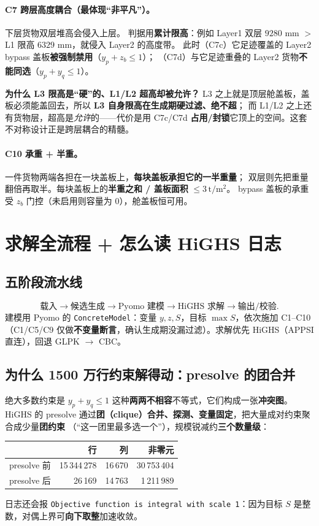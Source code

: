 \documentclass[11pt]{ctexart}
\newcommand{\unit}[1]{\,\mathrm{#1}}
\newcommand{\code}[1]{\texttt{#1}}
\begin{document}
\paragraph{C7 跨层高度耦合（最体现“非平凡”）。}下层货物双层堆高会侵入上层。
判据用\textbf{累计限高}：例如 Layer1 双层 $9280$ mm $>$ L1 限高 $6329$ mm，就侵入 Layer2 的高度带。
此时（C7c）它足迹覆盖的 Layer2 bypass 盖板\textbf{被强制禁用}（$y_p+z_b\le1$）；
（C7d）与它足迹重叠的 Layer2 货物\textbf{不能同选}（$y_p+y_q\le1$）。
\begin{key}\textbf{为什么 L3 限高是“硬”的、L1/L2 超高却被允许？}
L3 之上就是顶层舱盖板，盖板必须能盖回去，所以 \textbf{L3 自身限高在生成期硬过滤、绝不超}；
而 L1/L2 之上还有货物层，超高是\emph{允许}的——代价是用 C7c/C7d \textbf{占用/封锁}它顶上的空间。这套不对称设计正是跨层耦合的精髓。
\end{key}

\paragraph{C10 承重 + 半重。}一件货物两端各担在一块盖板上，\textbf{每块盖板承担它的一半重量}；
双层则先把重量翻倍再取半。每块盖板上的\textbf{半重之和 / 盖板面积} $\le 3\unit{t/m^2}$。
bypass 盖板的承重受 $z_b$ 门控（未启用则容量为 0），舱盖板恒可用。

\section{求解全流程 + 怎么读 HiGHS 日志}

\subsection{五阶段流水线}
\[
\text{载入}\to\text{候选生成}\to\text{Pyomo 建模}\to\text{HiGHS 求解}\to\text{输出/校验}.
\]
建模用 Pyomo 的 \code{ConcreteModel}：变量 $y,z,S$，目标 $\max S$，依次施加 C1--C10
（C1/C5/C9 仅做\textbf{不变量断言}，确认生成期没漏过滤）。求解优先 HiGHS（APPSI 直连），回退 GLPK $\to$ CBC。

\subsection{为什么 1500 万行约束解得动：presolve 的团合并}
绝大多数约束是 $y_p+y_q\le1$ 这种\textbf{两两不相容}不等式，它们构成一张\textbf{冲突图}。
HiGHS 的 presolve 通过\textbf{团（clique）合并、探测、变量固定}，把大量成对约束聚合成少量\textbf{团约束}
（“这一团里最多选一个”），规模锐减约\textbf{三个数量级}：
\begin{center}\small
\begin{tabular}{lrrr}
\toprule & 行 & 列 & 非零元 \\
\midrule
presolve 前 & 15\,344\,278 & 16\,670 & 30\,753\,404 \\
presolve 后 & 26\,169 & 14\,763 & 1\,211\,989 \\
\bottomrule
\end{tabular}
\end{center}
日志还会报 \code{Objective function is integral with scale 1}：因为目标 $S$ 是整数，对偶上界可\textbf{向下取整}加速收敛。
\end{document}
